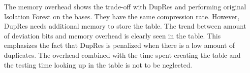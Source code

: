 The memory overhead shows the trade-off with DupRes and performing original Isolation Forest on the bases. They have the same compression rate. However, DupRes needs additional memory to store the table. The trend between amount of deviation bits and memory overhead is clearly seen in the table. This emphasizes the fact that DupRes is penalized when there is a low amount of duplicates. The overhead combined with the time spent creating the table and the testing time looking up in the table is not to be neglected.

